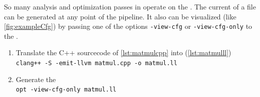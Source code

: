 So many analysis and optimization passes in \llvm operate on the \cfg.
The current \cfg of a \llvmir file can be generated at any point of the pipeline.
It also can be visualized (like \autoref{fig:exampleCfg}) by passing one of the options \texttt{-view-cfg} or \texttt{-view-cfg-only} to the \opt.
\begin{enumerate}
    \item Translate the C++ sourcecode of \autoref{lst:matmulcpp} into \llvmir (\autoref{lst:matmulll})\\
        \texttt{clang++ -S -emit-llvm matmul.cpp -o matmul.ll}
    \item Generate the \cfg\\
        \texttt{opt -view-cfg-only matmul.ll}
\end{enumerate}
